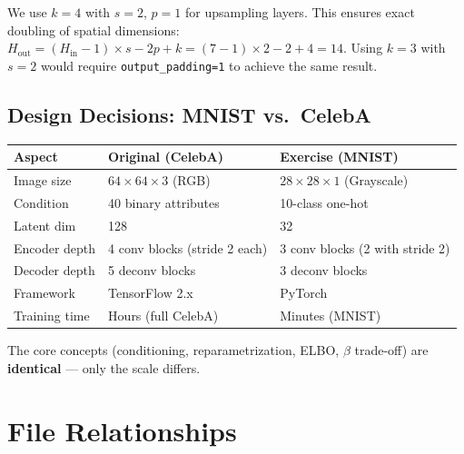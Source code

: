 \documentclass[11pt,a4paper]{article}
\begin{document}
\begin{note}
We use $k\!=\!4$ with $s\!=\!2$, $p\!=\!1$ for upsampling layers. This ensures exact doubling of spatial dimensions: $H_\text{out} = (H_\text{in} - 1) \times s - 2p + k = (7-1)\times 2 - 2 + 4 = 14$. Using $k\!=\!3$ with $s\!=\!2$ would require \texttt{output\_padding=1} to achieve the same result.
\end{note}

\subsection{Design Decisions: MNIST vs.\ CelebA}

\begin{center}
\begin{tabular}{lll}
\toprule
\textbf{Aspect} & \textbf{Original (CelebA)} & \textbf{Exercise (MNIST)} \\
\midrule
Image size & $64 \times 64 \times 3$ (RGB) & $28 \times 28 \times 1$ (Grayscale) \\
Condition & 40 binary attributes & 10-class one-hot \\
Latent dim & 128 & 32 \\
Encoder depth & 4 conv blocks (stride 2 each) & 3 conv blocks (2 with stride 2) \\
Decoder depth & 5 deconv blocks & 3 deconv blocks \\
Framework & TensorFlow 2.x & PyTorch \\
Training time & Hours (full CelebA) & Minutes (MNIST) \\
\bottomrule
\end{tabular}
\end{center}

The core concepts (conditioning, reparametrization, ELBO, $\beta$ trade-off) are \textbf{identical} --- only the scale differs.

\section{File Relationships}
\end{document}
